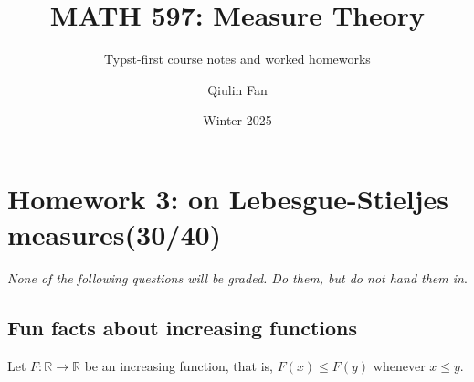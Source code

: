 \documentclass{qlnotes-export}
\title{MATH 597: Measure Theory}
\subtitle{Typst-first course notes and worked homeworks}
\author{Qiulin Fan}
\date{Winter 2025}
\begin{document}
\mainmatter
\chapter{Homework 3: on Lebesgue-Stieljes measures(30/40)}\label{homework-3-on-lebesgue-stieljes-measures3040}

\emph{None of the following questions will be graded. Do them, but do not hand them in}.

\section{Fun facts about increasing functions}\label{fun-facts-about-increasing-functions}

Let \(F:{\mathbb{R}}\rightarrow{\mathbb{R}}\) be an increasing function, that is, \(F(x) \leq F(y)\) whenever \(x \leq y\).
\end{document}
